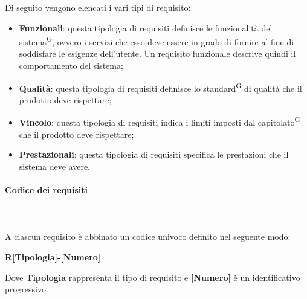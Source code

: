 \documentclass[8pt]{article}
\newcommand{\glossterm}[1]{#1\textsuperscript{G}} %
\newcommand{\subsubsubsection}[1]{\paragraph{#1}\mbox{}\\}
\begin{document}
Di seguito vengono elencati i vari tipi di requisito:
\begin{itemize} 
    \item \textbf{Funzionali}: questa tipologia di requisiti definisce le funzionalità del \glossterm{sistema}, ovvero i servizi che esso deve essere in grado di fornire al fine di soddisfare le esigenze dell'utente. Un requisito funzionale descrive quindi il comportamento del sistema;
    \item \textbf{Qualità}: questa tipologia di requisiti definisce lo \glossterm{standard} di qualità che il prodotto deve rispettare;
    \item \textbf{Vincolo}: questa tipologia di requisiti indica i limiti imposti dal \glossterm{capitolato} che il prodotto deve rispettare;
    \item \textbf{Prestazionali}: questa tipologia di requisiti specifica le prestazioni che il sistema deve avere. 
\end{itemize}

\subsubsubsection{Codice dei requisiti}\\
A ciascun requisito è abbinato un codice univoco definito nel seguente modo:
\begin{center}
    \textbf{R[Tipologia]-[Numero]}
\end{center}
Dove \textbf{Tipologia} rappresenta il tipo di requisito e \textbf{[Numero]} è un identificativo progressivo.

\end{document}
